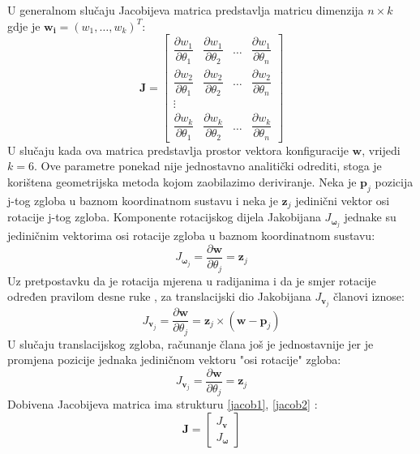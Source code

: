 \documentclass[times, utf8, diplomski, numeric]{fer}
\begin{document}
U generalnom slučaju Jacobijeva matrica predstavlja matricu dimenzija $n \times k$ gdje je $\mathbf{w_i} = (w_1, \ldots , w_k)^T$:
\begin{equation}
\mathbf{J} =
\begin{bmatrix}
    \dfrac{\partial {w_1}}{\partial \theta_{1}}      & \dfrac{\partial {w}_{1}}{\partial \theta_{2}}  & \dots & \dfrac{\partial {w}_{1}}{\partial \theta_{n}}  \\
    \dfrac{\partial{w}_{2}}{\partial \theta_{1}}      & \dfrac{\partial {w}_{2}}{\partial \theta_{2}}  & \dots & \dfrac{\partial {w}_{2}}{\partial \theta_{n}} \\
    \vdots \\
    \dfrac{\partial {w}_{k}}{\partial \theta_{1}}      & \dfrac{\partial {w}_{k}}{\partial \theta_{2}}  & \dots & \dfrac{\partial {w}_{k}}{\partial \theta_{n}}
\end{bmatrix}
\end{equation}
U slučaju kada ova matrica predstavlja prostor vektora konfiguracije $\mathbf{w}$, vrijedi $k=6$.
Ove parametre ponekad nije jednostavno analitički odrediti, stoga je korištena geometrijska metoda kojom zaobilazimo deriviranje. 
Neka je $\mathbf{p}_{j}$ pozicija j-tog zgloba u baznom koordinatnom sustavu i neka je $\mathbf{z}_{j}$ jedinični vektor osi rotacije j-tog zgloba. 
Komponente rotacijskog dijela Jakobijana $J_{\bm{\omega}_j}$ jednake su jediničnim vektorima osi rotacije zgloba u baznom koordinatnom sustavu:
\begin{equation}
J_{\bm{\omega}_j} = \dfrac{\partial \textbf{w}}{ \partial \theta_{j}} = \textbf{z}_{j}
\end{equation}
Uz pretpostavku da je rotacija mjerena u radijanima i da je smjer rotacije određen pravilom desne ruke , za translacijski dio Jakobijana $J_{\bm{v}_j}$ članovi iznose:
\begin{equation}
J_{\bm{v}_j} = \dfrac{\partial \mathbf{w}}{ \partial \theta_{j}} = \mathbf{z}_{j} \times (\mathbf{w} - \mathbf{p}_{j})
\end{equation}
U slučaju translacijskog zgloba, računanje člana još je jednostavnije jer je promjena pozicije jednaka jediničnom vektoru "osi rotacije" zgloba:
\begin{equation}
J_{\bm{v}_j} = \dfrac{\partial \mathbf{w}}{ \partial \theta_{j}} = \mathbf{z}_{j}
\end{equation}
Dobivena Jacobijeva matrica ima strukturu \ref{jacob1}, \ref{jacob2} :
\begin{equation}
\mathbf{J} =
\begin{bmatrix}
J_{\bm{v}}\\
J_{\bm{\omega}}
\end{bmatrix}
\label{jacob1}
\end{equation}
\end{document}
